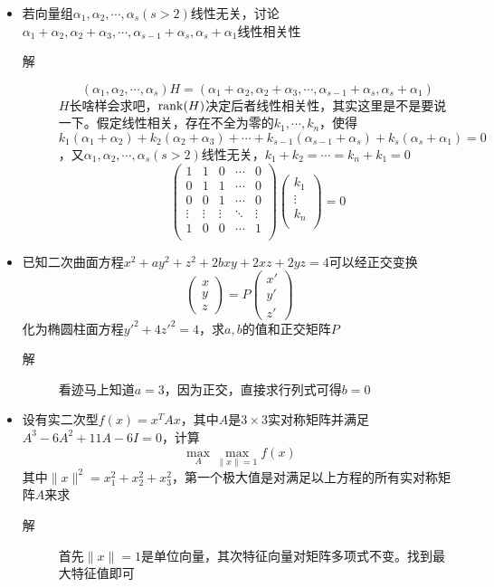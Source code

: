 \begin{itemize}
\item 若向量组$\alpha_1,\alpha_2,\cdots,\alpha_s(s>2)$线性无关，讨论$\alpha_1+\alpha_2,\alpha_2+\alpha_3,\cdots,\alpha_{s-1}+\alpha_s,\alpha_s+\alpha_1$线性相关性
\begin{description}
\item[解]
\[
(\alpha_1,\alpha_2,\cdots,\alpha_s)H=(\alpha_1+\alpha_2,\alpha_2+\alpha_3,\cdots,\alpha_{s-1}+\alpha_s,\alpha_s+\alpha_1)
\]
$H$长啥样会求吧，$\operatorname{rank}(H)$决定后者线性相关性，其实这里是不是要说一下。假定线性相关，存在不全为零的$k_1,\cdots,k_n$，使得$k_1(\alpha_1+\alpha_2)+k_2(\alpha_2+\alpha_3)+\cdots+k_{s-1}(\alpha_{s-1}+\alpha_s)+k_s(\alpha_s+\alpha_1)=0$，又$\alpha_1,\alpha_2,\cdots,\alpha_s(s>2)$线性无关，$k_1+k_2=\cdots=k_n+k_1=0$
\[
\left(
\begin{array}{ccccc}
1 & 1 & 0 & \cdots & 0\\
0 & 1 & 1 & \cdots & 0\\
0 & 0 & 1 & \cdots & 0\\
\vdots & \vdots & \vdots & \ddots & \vdots\\
1 & 0 & 0 & \cdots & 1\\
\end{array}
\right)
\left(
\begin{array}{c}
k_1\\
\vdots\\
k_n\\
\end{array}
\right)=0
\]
\end{description}

\item 已知二次曲面方程$x^2+ay^2+z^2+2bxy+2xz+2yz=4$可以经正交变换
\[
\left(
\begin{array}{c}
x \\
y\\
z
\end{array}
\right) = P \left(
\begin{array}{c}
x' \\
y' \\
z'
\end{array}
\right)
\]
化为椭圆柱面方程$y'^2+4z'^2=4$，求$a,b$的值和正交矩阵$P$
\begin{description}
\item[解] 看迹马上知道$a=3$，因为正交，直接求行列式可得$b=0$
\end{description}

\item 设有实二次型$f(x)=x^TAx$，其中$A$是$3\times 3$实对称矩阵并满足$A^3-6A^2+11A-6I=0$，计算
\[
\max_{A}\max_{\|x\|=1}f(x)
\]
其中$\|x\|^2=x_1^2+x_2^2+x_3^2$，第一个极大值是对满足以上方程的所有实对称矩阵$A$来求
\begin{description}
\item[解] 首先$\|x\|=1$是单位向量，其次特征向量对矩阵多项式不变。找到最大特征值即可
\end{description}


\end{itemize}
